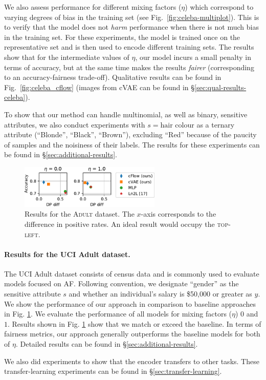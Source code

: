 %
We also assess performance for different mixing factors ($\eta$) which correspond to varying
degrees of bias in the training set (see Fig.~\ref{fig:celeba-multiplot}).
%
This is to verify that the model does not \emph{harm} performance when there is not much bias in
the training set.
%
For these experiments, the model is trained once on the representative set and is then used to
encode different training sets.
%
The results show that for the intermediate values of $\eta$, our model incurs a small penalty in
terms of accuracy, but at the same time makes the results \emph{fairer} (corresponding to an
accuracy-fairness trade-off). 
%
Qualitative results can be found in Fig.~\ref{fig:celeba_cflow} (images from \ac{cVAE} can be found
in \S\ref{sec:qual-results-celeba}).

To show that our method can handle multinomial, as well as binary, sensitive attributes, we also
conduct experiments with $s=\textrm{hair colour}$ as a ternary attribute (``Blonde'', ``Black'',
``Brown''), excluding ``Red'' because of the paucity of samples and the noisiness of their labels.
%
The results for these experiments can be found in \S\ref{sec:additional-results}.

\begin{figure}[tb]
  \centering
  \includegraphics[width=0.6\textwidth]{nifr/Figures/nosinn_adult_multiplot_mini_diff.pdf}
  \caption{
      Results for the \textsc{Adult} dataset.
      The $x$-axis corresponds to the difference in positive rates.
      An ideal result would occupy the \textsc{top-left}.
  }%
  \label{fig:adult-chart}
\end{figure}

\paragraph{Results for the UCI Adult dataset.}
%
The UCI Adult dataset consists of census data and is commonly used to evaluate models focused on
\acl{AF}.
%
Following convention, we designate ``gender'' as the sensitive attribute $s$ and whether an
individual's salary is \$50,000 or greater as $y$.
%
We show the performance of our approach in comparison to baseline approaches in Fig.
\ref{fig:adult-chart}.
%
We evaluate the performance of all models for mixing factors ($\eta$) $0$ and $1$. 
%
Results shown in Fig. \ref{fig:adult-chart} show that we match or exceed the baseline.
%
In terms of fairness metrics, our approach generally outperforms the baseline models for both of
$\eta$.
%
Detailed results can be found in \S\ref{sec:additional-results}.

We also did experiments to show that the encoder transfers to other tasks. 
%
These transfer-learning experiments can be found in \S\ref{sec:transfer-learning}.

